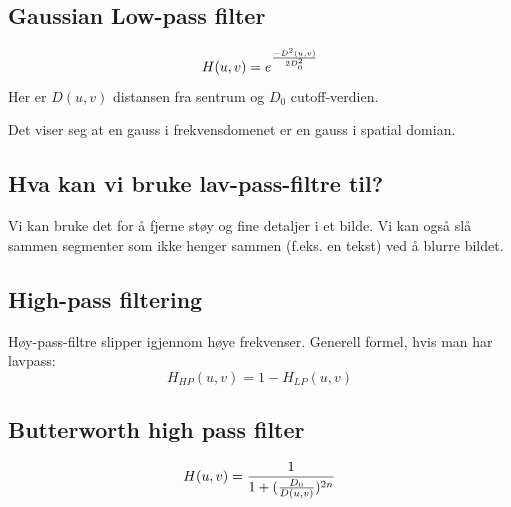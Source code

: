 \subsection{Gaussian Low-pass filter}
\begin{equation}
    H(u,v) = e^{
        -D^2(u,v) \over
        2D_0^2
    }
\end{equation}
Her er $D(u,v)$ distansen fra sentrum og $D_0$ cutoff-verdien.

Det viser seg at en gauss i frekvensdomenet er en gauss i spatial domian.

\subsection{Hva kan vi bruke lav-pass-filtre til?}
Vi kan bruke det for å fjerne støy og fine detaljer i et bilde. Vi kan også slå sammen segmenter som ikke henger sammen (f.eks. en tekst) ved å blurre bildet.

\subsection{High-pass filtering}
Høy-pass-filtre slipper igjennom høye frekvenser. Generell formel, hvis man har lavpass:
\begin{equation}
    H_{HP}(u,v) = 1 - H_{LP}(u,v)
\end{equation}


\subsection{Butterworth high pass filter}
\begin{equation}
    H(u,v) = {1 \over
        1 + ({D_0 \over D(u,v)})^{2n}
    }
\end{equation}
